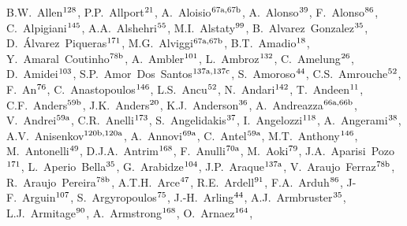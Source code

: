\begin{flushleft}
B.W.~Allen$^\textrm{\scriptsize 128}$,    
P.P.~Allport$^\textrm{\scriptsize 21}$,    
A.~Aloisio$^\textrm{\scriptsize 67a,67b}$,    
A.~Alonso$^\textrm{\scriptsize 39}$,    
F.~Alonso$^\textrm{\scriptsize 86}$,    
C.~Alpigiani$^\textrm{\scriptsize 145}$,    
A.A.~Alshehri$^\textrm{\scriptsize 55}$,    
M.I.~Alstaty$^\textrm{\scriptsize 99}$,    
B.~Alvarez~Gonzalez$^\textrm{\scriptsize 35}$,    
D.~\'{A}lvarez~Piqueras$^\textrm{\scriptsize 171}$,    
M.G.~Alviggi$^\textrm{\scriptsize 67a,67b}$,    
B.T.~Amadio$^\textrm{\scriptsize 18}$,    
Y.~Amaral~Coutinho$^\textrm{\scriptsize 78b}$,    
A.~Ambler$^\textrm{\scriptsize 101}$,    
L.~Ambroz$^\textrm{\scriptsize 132}$,    
C.~Amelung$^\textrm{\scriptsize 26}$,    
D.~Amidei$^\textrm{\scriptsize 103}$,    
S.P.~Amor~Dos~Santos$^\textrm{\scriptsize 137a,137c}$,    
S.~Amoroso$^\textrm{\scriptsize 44}$,    
C.S.~Amrouche$^\textrm{\scriptsize 52}$,    
F.~An$^\textrm{\scriptsize 76}$,    
C.~Anastopoulos$^\textrm{\scriptsize 146}$,    
L.S.~Ancu$^\textrm{\scriptsize 52}$,    
N.~Andari$^\textrm{\scriptsize 142}$,    
T.~Andeen$^\textrm{\scriptsize 11}$,    
C.F.~Anders$^\textrm{\scriptsize 59b}$,    
J.K.~Anders$^\textrm{\scriptsize 20}$,    
K.J.~Anderson$^\textrm{\scriptsize 36}$,    
A.~Andreazza$^\textrm{\scriptsize 66a,66b}$,    
V.~Andrei$^\textrm{\scriptsize 59a}$,    
C.R.~Anelli$^\textrm{\scriptsize 173}$,    
S.~Angelidakis$^\textrm{\scriptsize 37}$,    
I.~Angelozzi$^\textrm{\scriptsize 118}$,    
A.~Angerami$^\textrm{\scriptsize 38}$,    
A.V.~Anisenkov$^\textrm{\scriptsize 120b,120a}$,    
A.~Annovi$^\textrm{\scriptsize 69a}$,    
C.~Antel$^\textrm{\scriptsize 59a}$,    
M.T.~Anthony$^\textrm{\scriptsize 146}$,    
M.~Antonelli$^\textrm{\scriptsize 49}$,    
D.J.A.~Antrim$^\textrm{\scriptsize 168}$,    
F.~Anulli$^\textrm{\scriptsize 70a}$,    
M.~Aoki$^\textrm{\scriptsize 79}$,    
J.A.~Aparisi~Pozo$^\textrm{\scriptsize 171}$,    
L.~Aperio~Bella$^\textrm{\scriptsize 35}$,    
G.~Arabidze$^\textrm{\scriptsize 104}$,    
J.P.~Araque$^\textrm{\scriptsize 137a}$,    
V.~Araujo~Ferraz$^\textrm{\scriptsize 78b}$,    
R.~Araujo~Pereira$^\textrm{\scriptsize 78b}$,    
A.T.H.~Arce$^\textrm{\scriptsize 47}$,    
R.E.~Ardell$^\textrm{\scriptsize 91}$,    
F.A.~Arduh$^\textrm{\scriptsize 86}$,    
J-F.~Arguin$^\textrm{\scriptsize 107}$,    
S.~Argyropoulos$^\textrm{\scriptsize 75}$,    
J.-H.~Arling$^\textrm{\scriptsize 44}$,    
A.J.~Armbruster$^\textrm{\scriptsize 35}$,    
L.J.~Armitage$^\textrm{\scriptsize 90}$,    
A.~Armstrong$^\textrm{\scriptsize 168}$,    
O.~Arnaez$^\textrm{\scriptsize 164}$,    

\end{flushleft}
